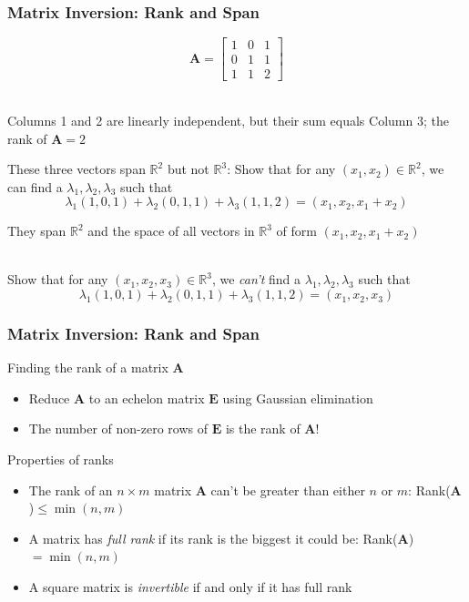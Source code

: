 \documentclass[handout]{beamer}
\numberwithin{equation}{section}
\begin{document}
\begin{frame}
\frametitle{Matrix Inversion: Rank and Span}

$$\mathbf{A}=\begin{bmatrix}
1&0&1\\
0&1&1\\
1&1&2
\end{bmatrix}$$ \pause

\ \\Columns 1 and 2 are linearly independent, but their sum equals Column 3; the rank of $\mathbf{A}=2$ \pause

These three vectors span $\mathbb{R}^2$ but not $\mathbb{R}^3$: Show that for any $(x_1, x_2)\in \mathbb{R}^2$, we can find a $\lambda_1, \lambda_2, \lambda_3$ such that $$\lambda_1(1, 0, 1)+\lambda_2(0, 1, 1)+\lambda_3(1, 1, 2)=(x_1, x_2, x_1+x_2)$$ \pause

They span $\mathbb{R}^2$ and the space of all vectors in $\mathbb{R}^3$ of form $(x_1, x_2, x_1+x_2)$ \pause

\ \\Show that for any $(x_1, x_2, x_3)\in \mathbb{R}^3$, we \textit{can't} find a $\lambda_1, \lambda_2, \lambda_3$ such that $$\lambda_1(1, 0, 1)+\lambda_2(0, 1, 1)+\lambda_3(1, 1, 2)=(x_1, x_2, x_3)$$

\end{frame}



\begin{frame}
\frametitle{Matrix Inversion: Rank and Span}

Finding the rank of a matrix $\mathbf{A}$ \pause

\begin{itemize}
\item Reduce $\mathbf{A}$ to an echelon matrix $\mathbf{E}$ using Gaussian elimination \pause
\item The number of non-zero rows of $\mathbf{E}$ is the rank of $\mathbf{A}$! \pause
\end{itemize}

\vspace{.3in}
Properties of ranks \pause

\begin{itemize}
\item The rank of an $n\times m$ matrix  $\mathbf{A}$ can't be greater than either $n$ or $m$: Rank($\mathbf{A}$)$\leq \min (n, m)$ \pause
\item A matrix has \textit{full rank} if its rank is the biggest it could be: Rank($\mathbf{A}$)$= \min (n, m)$ \pause
\item A square matrix is \textit{invertible} if and only if it has full rank
\end{itemize}
\end{frame}
\end{document}
